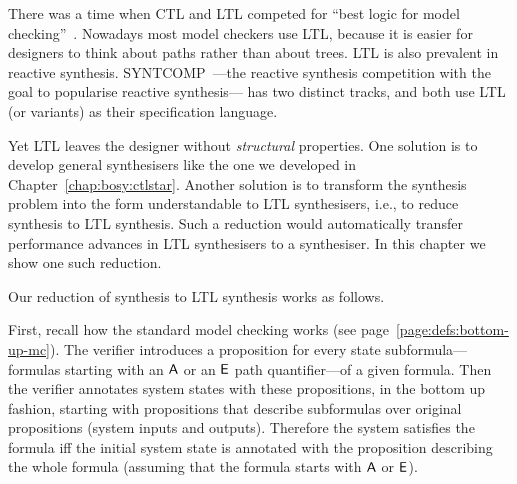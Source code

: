 There was a time when CTL and LTL competed for ``best logic for model checking''~\cite{LTL-vs-CTL}.
Nowadays most model checkers use LTL,
because it is easier for designers to think about paths rather than about trees.
LTL is also prevalent in reactive synthesis.
SYNTCOMP~\cite{syntcomp}---the reactive synthesis competition with the goal to popularise reactive synthesis---%
has two distinct tracks, and both use LTL (or variants) as their specification language.

Yet LTL leaves the designer without \emph{structural} properties.
One solution is to develop general \CTLstar synthesisers like the one we developed in Chapter~\ref{chap:bosy:ctlstar}.
Another solution is to transform the \CTLstar synthesis problem into
the form understandable to LTL synthesisers, i.e., to reduce \CTLstar synthesis to LTL synthesis.
Such a reduction would automatically transfer performance advances in LTL synthesisers
to a \CTLstar synthesiser.
In this chapter we show one such reduction.

Our reduction of \CTLstar synthesis to LTL synthesis works as follows.

First, recall how the standard \CTLstar model checking works (see page~\ref{page:defs:bottom-up-mc}).
The verifier introduces a proposition for every state subformula---formulas starting with an ${\operatorname{\mathsf{A}}}$ or an ${\operatorname{\mathsf{E}}}$ path quantifier---of a given \CTLstar formula.
Then the verifier annotates system states with these propositions,
in the bottom up fashion,
starting with propositions that describe subformulas over original propositions (system inputs and outputs).
Therefore the system satisfies the \CTLstar formula iff the initial system state is annotated
with the proposition describing the whole \CTLstar formula
(assuming that the \CTLstar formula starts with ${\operatorname{\mathsf{A}}}$ or ${\operatorname{\mathsf{E}}}$).


